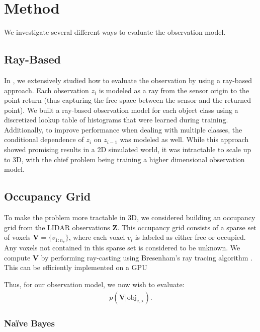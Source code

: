 \section{Method} \label{sec:method}

We investigate several different ways to evaluate the observation model.

\subsection{Ray-Based}

In \cite{ushani_raybased}, we extensively studied how to evaluate the
observation by using a ray-based approach. Each observation $z_i$ is modeled as
a ray from the sensor origin to the point return (thus capturing the free space
between the sensor and the returned point). We built a ray-based observation
model for each object class using a discretized lookup table of histograms that
were learned during training. Additionally, to improve performance when dealing
with multiple classes, the conditional dependence of $z_i$ on $z_{i-1}$ was
modeled as well. While this approach showed promising results in a 2D simulated
world, it was intractable to scale up to 3D, with the chief problem being
training a higher dimensional observation model.

\subsection{Occupancy Grid}

To make the problem more tractable in 3D, we considered building an occupancy
grid from the \ac{LIDAR} observations $\mathbf{Z}$. This occupancy grid consists
of a sparse set of voxels $\mathbf{V} = \{v_{1:n_v}\}$, where each voxel $v_i$
is labeled as either free or occupied. Any voxels not contained in this sparse
set is considered to be unknown. We compute $\mathbf{V}$ by performing
ray-casting using Bresenham's ray tracing algorithm
\cite{bresenham1965algorithm}. This can be efficiently implemented on a \ac{GPU}

Thus, for our observation model, we now wish to evaluate:
%
\begin{align}
  p(\mathbf{V} | \mathrm{obj_{c, x}}) \text{.} \label{eq:detection_map}
\end{align}

\subsubsection{Na\"ive Bayes} \label{sec:naive_bayes}

